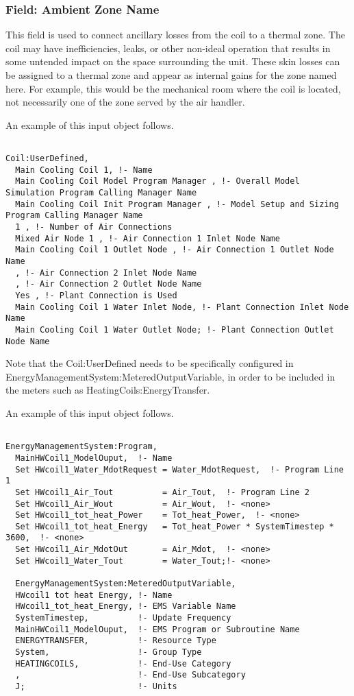 \subsubsection{Field: Ambient Zone Name}\label{field-ambient-zone-name-2}

This field is used to connect ancillary losses from the coil to a thermal zone. The coil may have inefficiencies, leaks, or other non-ideal operation that results in some untended impact on the space surrounding the unit. These skin losses can be assigned to a thermal zone and appear as internal gains for the zone named here. For example, this would be the mechanical room where the coil is located, not necessarily one of the zone served by the air handler.

An example of this input object follows.

\begin{lstlisting}

Coil:UserDefined,
  Main Cooling Coil 1, !- Name
  Main Cooling Coil Model Program Manager , !- Overall Model Simulation Program Calling Manager Name
  Main Cooling Coil Init Program Manager , !- Model Setup and Sizing Program Calling Manager Name
  1 , !- Number of Air Connections
  Mixed Air Node 1 , !- Air Connection 1 Inlet Node Name
  Main Cooling Coil 1 Outlet Node , !- Air Connection 1 Outlet Node Name
  , !- Air Connection 2 Inlet Node Name
  , !- Air Connection 2 Outlet Node Name
  Yes , !- Plant Connection is Used
  Main Cooling Coil 1 Water Inlet Node, !- Plant Connection Inlet Node Name
  Main Cooling Coil 1 Water Outlet Node; !- Plant Connection Outlet Node Name
\end{lstlisting}

Note that the Coil:UserDefined needs to be specifically configured in EnergyManagementSystem:MeteredOutputVariable, in order to be included in the meters such as HeatingCoils:EnergyTransfer.

An example of this input object follows.

\begin{lstlisting}

EnergyManagementSystem:Program,
  MainHWCoil1_ModelOuput,  !- Name
  Set HWcoil1_Water_MdotRequest = Water_MdotRequest,  !- Program Line 1
  Set HWcoil1_Air_Tout          = Air_Tout,  !- Program Line 2
  Set HWcoil1_Air_Wout          = Air_Wout,  !- <none>
  Set HWcoil1_tot_heat_Power    = Tot_heat_Power,  !- <none>
  Set HWcoil1_tot_heat_Energy   = Tot_heat_Power * SystemTimestep * 3600,  !- <none>
  Set HWcoil1_Air_MdotOut       = Air_Mdot,  !- <none>
  Set HWcoil1_Water_Tout        = Water_Tout;!- <none>

  EnergyManagementSystem:MeteredOutputVariable,
  HWcoil1 tot heat Energy, !- Name
  HWcoil1_tot_heat_Energy, !- EMS Variable Name
  SystemTimestep,          !- Update Frequency
  MainHWCoil1_ModelOuput,  !- EMS Program or Subroutine Name
  ENERGYTRANSFER,          !- Resource Type
  System,                  !- Group Type
  HEATINGCOILS,            !- End-Use Category
  ,                        !- End-Use Subcategory
  J;                       !- Units
\end{lstlisting}

